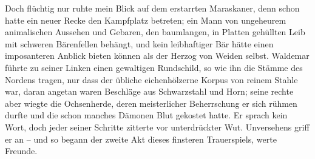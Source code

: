 Doch flüchtig nur ruhte mein Blick auf dem erstarrten Maraskaner, denn schon hatte ein neuer Recke den Kampfplatz betreten; ein Mann von ungeheurem animalischen Aussehen und Gebaren, den baumlangen, in Platten gehüllten Leib mit schweren Bärenfellen behängt, und kein leibhaftiger Bär hätte einen imposanteren Anblick bieten können als der Herzog von Weiden selbst. Waldemar führte zu seiner Linken einen gewaltigen Rundschild, so wie ihn die Stämme des Nordens tragen, nur dass der übliche eichenhölzerne Korpus von reinem Stahle war, daran angetan waren Beschläge aus Schwarzstahl und Horn; seine rechte aber wiegte die Ochsenherde, deren meisterlicher Beherrschung er sich rühmen durfte und die schon manches Dämonen Blut gekostet hatte. Er sprach kein Wort, doch jeder seiner Schritte zitterte vor unterdrückter Wut. Unversehens griff er an -- und so begann der zweite Akt dieses finsteren Trauerspiels, werte Freunde.

